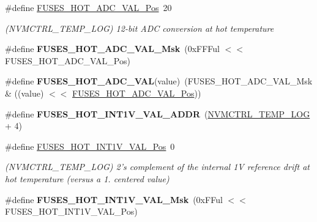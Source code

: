 \begin{DoxyCompactItemize}
\item 
\hypertarget{group__fuses__api_gafe7e5ce8a612702c58af6772f5e29985}{}\#define \hyperlink{group__fuses__api_gafe7e5ce8a612702c58af6772f5e29985}{F\+U\+S\+E\+S\+\_\+\+H\+O\+T\+\_\+\+A\+D\+C\+\_\+\+V\+A\+L\+\_\+\+Pos}~20\label{group__fuses__api_gafe7e5ce8a612702c58af6772f5e29985}

\begin{DoxyCompactList}\small\item\em (N\+V\+M\+C\+T\+R\+L\+\_\+\+T\+E\+M\+P\+\_\+\+L\+O\+G) 12-\/bit A\+D\+C conversion at hot temperature \end{DoxyCompactList}\item 
\hypertarget{group__fuses__api_ga838deb7bc86528e492764edddcf49ece}{}\#define {\bfseries F\+U\+S\+E\+S\+\_\+\+H\+O\+T\+\_\+\+A\+D\+C\+\_\+\+V\+A\+L\+\_\+\+Msk}~(0x\+F\+F\+Ful $<$$<$ F\+U\+S\+E\+S\+\_\+\+H\+O\+T\+\_\+\+A\+D\+C\+\_\+\+V\+A\+L\+\_\+\+Pos)\label{group__fuses__api_ga838deb7bc86528e492764edddcf49ece}

\item 
\hypertarget{group__fuses__api_ga2742e55293067bb3c9da18f85c64070c}{}\#define {\bfseries F\+U\+S\+E\+S\+\_\+\+H\+O\+T\+\_\+\+A\+D\+C\+\_\+\+V\+A\+L}(value)~(F\+U\+S\+E\+S\+\_\+\+H\+O\+T\+\_\+\+A\+D\+C\+\_\+\+V\+A\+L\+\_\+\+Msk \& ((value) $<$$<$ \hyperlink{group__fuses__api_gafe7e5ce8a612702c58af6772f5e29985}{F\+U\+S\+E\+S\+\_\+\+H\+O\+T\+\_\+\+A\+D\+C\+\_\+\+V\+A\+L\+\_\+\+Pos}))\label{group__fuses__api_ga2742e55293067bb3c9da18f85c64070c}

\item 
\hypertarget{group__fuses__api_ga3c704507ec0c25c1e0ce3f92e4d7d9bc}{}\#define {\bfseries F\+U\+S\+E\+S\+\_\+\+H\+O\+T\+\_\+\+I\+N\+T1\+V\+\_\+\+V\+A\+L\+\_\+\+A\+D\+D\+R}~(\hyperlink{group___s_a_m_l21_j18_a__base_gae900d443ec6d7cf1c90d21b6662fa447}{N\+V\+M\+C\+T\+R\+L\+\_\+\+T\+E\+M\+P\+\_\+\+L\+O\+G} + 4)\label{group__fuses__api_ga3c704507ec0c25c1e0ce3f92e4d7d9bc}

\item 
\hypertarget{group__fuses__api_ga8b14f5897dd4c958cde93e08ee14ae2a}{}\#define \hyperlink{group__fuses__api_ga8b14f5897dd4c958cde93e08ee14ae2a}{F\+U\+S\+E\+S\+\_\+\+H\+O\+T\+\_\+\+I\+N\+T1\+V\+\_\+\+V\+A\+L\+\_\+\+Pos}~0\label{group__fuses__api_ga8b14f5897dd4c958cde93e08ee14ae2a}

\begin{DoxyCompactList}\small\item\em (N\+V\+M\+C\+T\+R\+L\+\_\+\+T\+E\+M\+P\+\_\+\+L\+O\+G) 2's complement of the internal 1\+V reference drift at hot temperature (versus a 1. centered value) \end{DoxyCompactList}\item 
\hypertarget{group__fuses__api_gada7c46dde8de1bb6463b4f652c54d610}{}\#define {\bfseries F\+U\+S\+E\+S\+\_\+\+H\+O\+T\+\_\+\+I\+N\+T1\+V\+\_\+\+V\+A\+L\+\_\+\+Msk}~(0x\+F\+Ful $<$$<$ F\+U\+S\+E\+S\+\_\+\+H\+O\+T\+\_\+\+I\+N\+T1\+V\+\_\+\+V\+A\+L\+\_\+\+Pos)\label{group__fuses__api_gada7c46dde8de1bb6463b4f652c54d610}


\end{DoxyCompactItemize}
